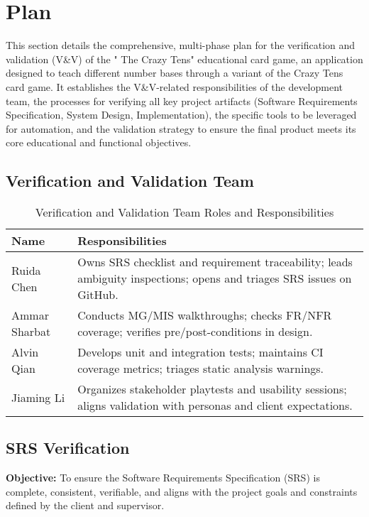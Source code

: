 \documentclass[12pt, titlepage]{article}
\begin{document}
\citet{SRS}


\section{Plan}
This section details the comprehensive, multi-phase plan for the verification and validation (V\&V) of the " The Crazy Tens" educational card game, an application designed to teach different number bases through a variant of the Crazy Tens card game. It establishes the V\&V-related responsibilities of the development team, the processes for verifying all key project artifacts (Software Requirements Specification, System Design, Implementation), the specific tools to be leveraged for automation, and the validation strategy to ensure the final product meets its core educational and functional objectives.   



\subsection{Verification and Validation Team}

\begin{table}[H]
\centering
\caption{Verification and Validation Team Roles and Responsibilities}
\label{tab:vvteam}
\begin{tabularx}{\textwidth}{lX}
\toprule
\textbf{Name} & \textbf{Responsibilities} \\
\midrule
Ruida Chen & Owns SRS checklist and requirement traceability; leads ambiguity inspections; opens and triages SRS issues on GitHub. \\
Ammar Sharbat & Conducts MG/MIS walkthroughs; checks FR/NFR coverage; verifies pre/post-conditions in design. \\
Alvin Qian & Develops unit and integration tests; maintains CI coverage metrics; triages static analysis warnings. \\
Jiaming Li & Organizes stakeholder playtests and usability sessions; aligns validation with personas and client expectations. \\
\bottomrule
\end{tabularx}
\end{table}

\subsection{SRS Verification}
\textbf{Objective:}  
To ensure the Software Requirements Specification (SRS) is complete, consistent, verifiable, and aligns with the project goals and constraints defined by the client and supervisor.
\end{document}
